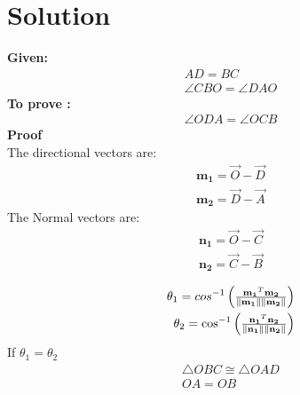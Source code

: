 \documentclass[10pt,a4paper]{article}
\newcommand{\myvec}[1]{\ensuremath{\begin{pmatrix}#1\end{pmatrix}}}
\let\vec\mathbf
\begin{document}
\section{Solution}
\textbf{Given:}
\begin{align}
    AD=BC\\
    \angle{CBO}=\angle{DAO}
\end{align}
\textbf{To prove :}
\begin{align}
    \angle{ODA}=\angle{OCB}
\end{align}
\textbf{Proof}\\
The directional vectors are:
\begin{align}
    \vec{m_1}=\Vec{O}-\Vec{D}\\
    \vec{m_2}=\Vec{D}-\Vec{A}
\end{align}
The Normal vectors are:
\begin{align}
    \vec{n_1}=\Vec{O}-\Vec{C}\\
    \vec{n_2}=\Vec{C}-\Vec{B}\\
\end{align}
\begin{align}
	\theta_1 =cos^{-1}\myvec{\frac{\vec{m_1}^T\vec{m_2}}{\norm{\vec{m_1}}\norm{\vec{m_2}}}}\\
	\theta_2 =\cos^{-1}\myvec{\frac{\vec{n_1}^T\vec{n_2}}{\norm{\vec{n_1}}\norm{\vec{n_2}}}}
\end{align}
If $\theta_1 = \theta_2$
\begin{align}
    \triangle{OBC} \cong \triangle{OAD}\\
    OA = OB
\end{align}
\end{document}
